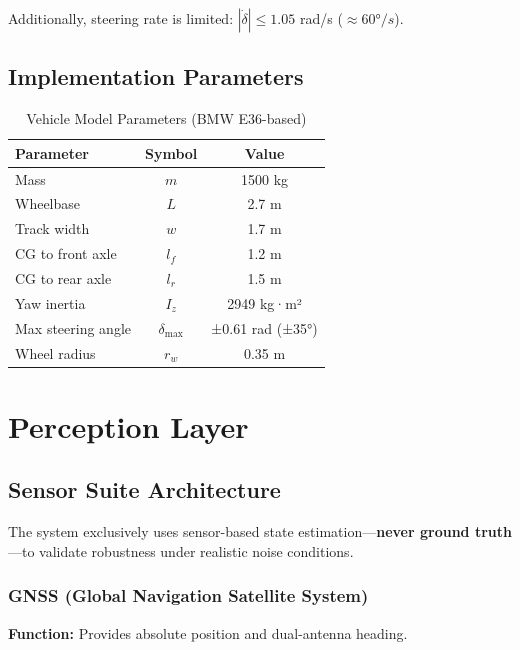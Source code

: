 \documentclass[12pt]{article}
\begin{document}
Additionally, steering rate is limited: $|\dot{\delta}| \leq 1.05$ rad/s ($\approx60°/s$).

\subsection{Implementation Parameters}

\begin{table}[H]
\centering
\caption{Vehicle Model Parameters (BMW E36-based)}
\begin{tabular}{lcc}
\toprule
\textbf{Parameter} & \textbf{Symbol} & \textbf{Value} \\
\midrule
Mass & $m$ & 1500 kg \\
Wheelbase & $L$ & 2.7 m \\
Track width & $w$ & 1.7 m \\
CG to front axle & $l_f$ & 1.2 m \\
CG to rear axle & $l_r$ & 1.5 m \\
Yaw inertia & $I_z$ & 2949 kg·m² \\
Max steering angle & $\delta_{\max}$ & ±0.61 rad (±35°) \\
Wheel radius & $r_w$ & 0.35 m \\
\bottomrule
\end{tabular}
\end{table}

\section{Perception Layer}

\subsection{Sensor Suite Architecture}

The system exclusively uses sensor-based state estimation—\textbf{never ground truth}—to validate robustness under realistic noise conditions.

\subsubsection{GNSS (Global Navigation Satellite System)}

\textbf{Function:} Provides absolute position and dual-antenna heading.
\end{document}
